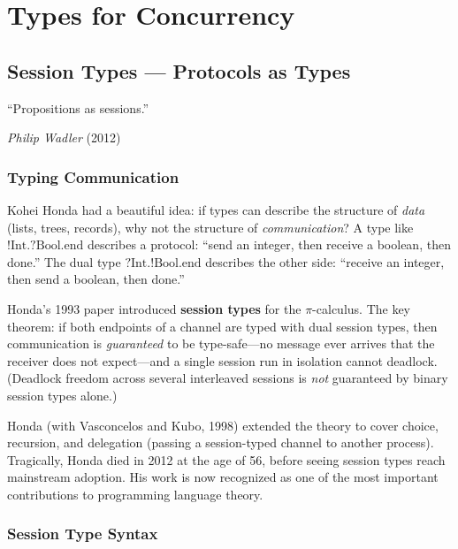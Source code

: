\documentclass[11pt, a4paper, oneside]{book}
\begin{document}
\part{Types for Concurrency}

\chapter{Session Types --- Protocols as Types}

\epigraph{``Propositions as sessions.''}{\textit{Philip Wadler} (2012)}

\section{Typing Communication}

\begin{historical}[title={Kohei Honda (1956--2012)}]
Kohei Honda had a beautiful idea: if types can describe the structure of
\emph{data} (lists, trees, records), why not the structure of
\emph{communication}? A type like $!\text{Int}.?\text{Bool}.\text{end}$
describes a protocol: ``send an integer, then receive a boolean, then
done.'' The dual type $?\text{Int}.!\text{Bool}.\text{end}$ describes the
other side: ``receive an integer, then send a boolean, then done.''

Honda's 1993 paper introduced \textbf{session types} for the $\pi$-calculus.
The key theorem: if both endpoints of a channel are typed with dual session
types, then communication is \emph{guaranteed} to be type-safe---no message
ever arrives that the receiver does not expect---and a single session run in
isolation cannot deadlock. (Deadlock freedom across several interleaved
sessions is \emph{not} guaranteed by binary session types alone.)

Honda (with Vasconcelos and Kubo, 1998) extended the theory to cover choice,
recursion, and delegation (passing a session-typed channel to another
process). Tragically, Honda died in 2012 at the age of 56, before seeing
session types reach mainstream adoption. His work is now recognized as one
of the most important contributions to programming language theory.
\end{historical}

\section{Session Type Syntax}
\end{document}
